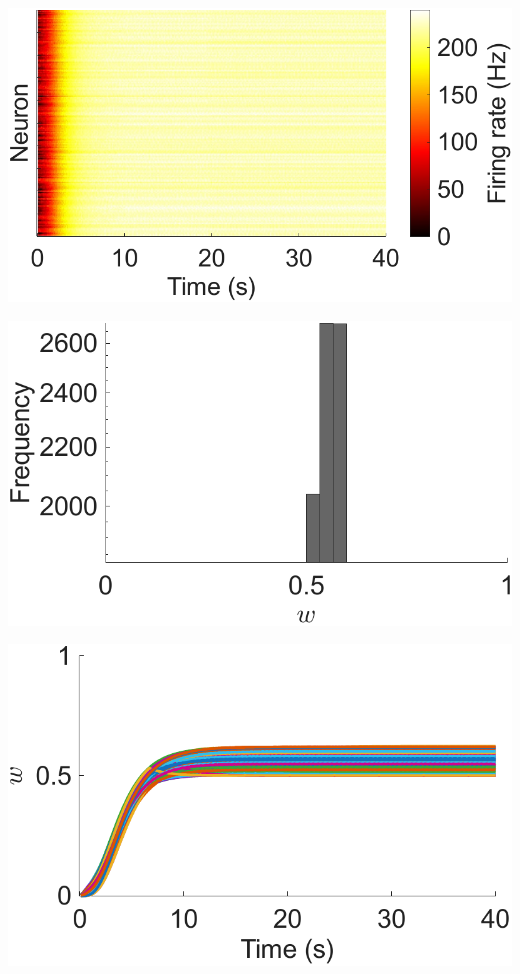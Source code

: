 \documentclass[utf8]{frontiers_suppmat} %
\begin{document}
\begin{subfigure}
\begin{minipage}[b]{0.32\textwidth}
        \caption{}
    \end{minipage}
\setcounter{figure}{1}
\setcounter{subfigure}{6}
    \begin{minipage}[b]{0.32\textwidth}
        \includegraphics[width=\linewidth]{mulSTDP_half/Hz.pdf}
        \caption{}
    \end{minipage}%
\setcounter{figure}{1}
\setcounter{subfigure}{7}
    \begin{minipage}[b]{0.32\textwidth}
        \includegraphics[width=\linewidth]{mulSTDP_half/weights_E2E_histogram.pdf}
        \caption{}
    \end{minipage}%
\setcounter{figure}{1}
\setcounter{subfigure}{8}
    \begin{minipage}[b]{0.32\textwidth}
        \includegraphics[width=\linewidth]{mulSTDP_half/weights_E2E_traces.pdf}
        \caption{}
    \end{minipage}


\end{subfigure}
\end{document}
